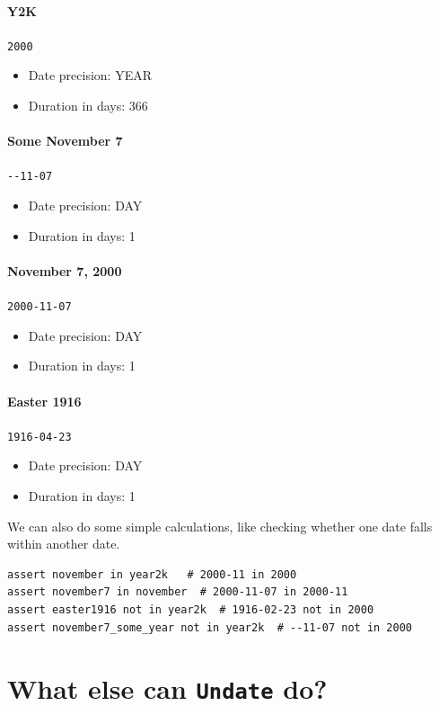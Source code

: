 \documentclass[final]{anthology-ch} %
\begin{document}
\paragraph{Y2K} \texttt{2000}
\begin{itemize}
    \item Date precision: YEAR
    \item Duration in days: 366
\end{itemize}

\paragraph{Some November 7} \texttt{-}\texttt{-11-07}
\begin{itemize}
   \item  Date precision: DAY
   \item Duration in days: 1
\end{itemize}

\paragraph{November 7, 2000} \texttt{2000-11-07}
\begin{itemize}
    \item Date precision: DAY
    \item Duration in days: 1
\end{itemize}

\paragraph{Easter 1916} \texttt{1916-04-23}
\begin{itemize}
    \item Date precision: DAY
    \item Duration in days: 1
\end{itemize}

We can also do some simple calculations, like checking whether one date falls within another date.
\begin{verbatim}
assert november in year2k   # 2000-11 in 2000
assert november7 in november  # 2000-11-07 in 2000-11
assert easter1916 not in year2k  # 1916-02-23 not in 2000
assert november7_some_year not in year2k  # --11-07 not in 2000
\end{verbatim}

\section{What else can \texttt{Undate} do?}
\end{document}
